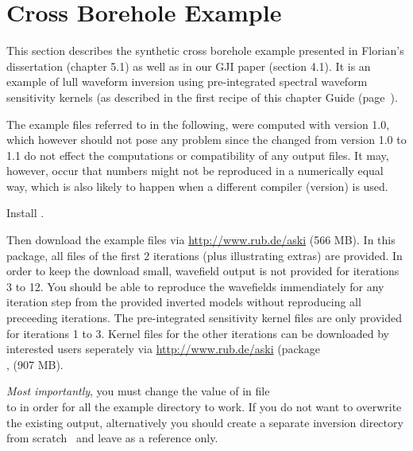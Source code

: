 \section*{Cross Borehole Example} \label{guide,sec:example_C_borehole}
%
This section describes the synthetic cross borehole example presented in Florian's dissertation 
\cite{_743d334d-dfa4-4a16-8cc5-91cdadc95271} (chapter 5.1) as well as in our GJI paper \cite{Schumacher16} 
(section 4.1). It is an example of lull waveform inversion using pre-integrated spectral waveform sensitivity 
kernels (as described in the first recipe of this chapter Guide (page~\pageref{guide}).

The example files referred to in the following, were computed with \ASKI{} version 1.0, which however should
not pose any problem since the changed from version 1.0 to 1.1 do not effect the computations or compatibility
of any output files. It may, however, 
occur that numbers might not be reproduced in a numerically equal way, which is also likely to happen
when a different compiler (version) is used. 

Install \ASKI{} . 

Then download the example
files  via \url{http://www.rub.de/aski} (566 MB). 
In this package, all files of the first 2 iterations (plus illustrating extras) are provided. 
In order to keep the download small, wavefield output is not provided  for
iterations 3 to 12. You should be able to reproduce the wavefields immendiately for any iteration step
from the provided inverted models without reproducing all preceeding iterations. 
The pre-integrated sensitivity kernel files are only provided for
iterations 1 to 3. Kernel files for the other iterations can be downloaded by
interested users seperately via \url{http://www.rub.de/aski} (package\\
, (907 MB).

\emph{Most importantly}, you must change the value of 
in file\\
 to
 in order for all the example directory to work. 
If you do not want to overwrite the existing output, alternatively you 
should create a separate inversion directory from scratch~
 and leave 
as a reference only. 

